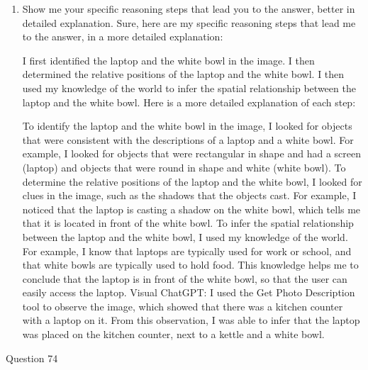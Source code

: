 \begin{enumerate}
    Here are some additional details about the spatial relationship between the laptop and the white bowl:
    
    The laptop is a computer that is used to access the internet, work on documents, and more.
    The white bowl is a container that is used to hold food or other objects.
    The laptop is in front of the white bowl, meaning that it is located closer to the front of the table.
    The white bowl is behind the laptop, meaning that it is located closer to the back of the table.
    \subitem Visual ChatGPT: The laptop is placed on the kitchen counter, next to a white bowl.
    \item Show me your specific reasoning steps that lead you to the answer, better in detailed explanation.
    \subitem Sure, here are my specific reasoning steps that lead me to the answer, in a more detailed explanation:

    I first identified the laptop and the white bowl in the image.
    I then determined the relative positions of the laptop and the white bowl.
    I then used my knowledge of the world to infer the spatial relationship between the laptop and the white bowl.
    Here is a more detailed explanation of each step:
    
    To identify the laptop and the white bowl in the image, I looked for objects that were consistent with the descriptions of a laptop and a white bowl. For example, I looked for objects that were rectangular in shape and had a screen (laptop) and objects that were round in shape and white (white bowl).
    To determine the relative positions of the laptop and the white bowl, I looked for clues in the image, such as the shadows that the objects cast. For example, I noticed that the laptop is casting a shadow on the white bowl, which tells me that it is located in front of the white bowl.
    To infer the spatial relationship between the laptop and the white bowl, I used my knowledge of the world. For example, I know that laptops are typically used for work or school, and that white bowls are typically used to hold food. This knowledge helps me to conclude that the laptop is in front of the white bowl, so that the user can easily access the laptop.
    \subitem Visual ChatGPT: I used the Get Photo Description tool to observe the image, which showed that there was a kitchen counter with a laptop on it. From this observation, I was able to infer that the laptop was placed on the kitchen counter, next to a kettle and a white bowl.
\end{enumerate}
Question 74\\
